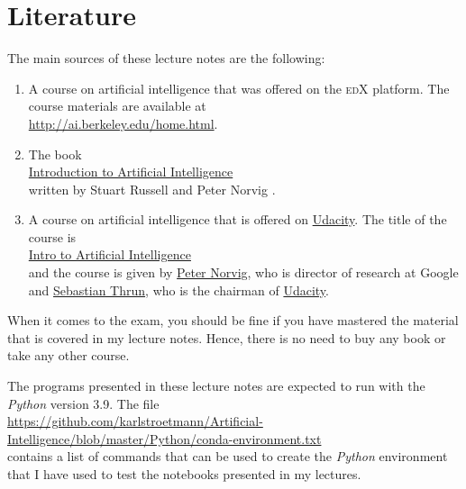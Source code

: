 \section{Literature}
The main sources of these lecture notes are the following:
\begin{enumerate}
\item A course on artificial intelligence that was offered on the \textsc{edX} platform.  The course
      materials are available at  
      \\[0.2cm]
      \hspace*{1.3cm}
      \href{http://ai.berkeley.edu/home.html}{http://ai.berkeley.edu/home.html}.
\item The book
      \\[0.2cm]
      \hspace*{1.3cm}
      \href{https://www.amazon.de/Artificial-Intelligence-Modern-Approach-Global/dp/1292401133/}{Introduction to Artificial Intelligence}
      \\[0.2cm]
      written by Stuart Russell and Peter Norvig \cite{russell:2020}.
\item A course on artificial intelligence that is offered on \href{https://www.udacity.com}{Udacity}.  The title of the
      course is
      \\[0.2cm]
      \hspace*{1.3cm}
      \href{https://www.udacity.com/course/intro-to-artificial-intelligence--cs271}{Intro to Artificial Intelligence}
      \\[0.2cm]
      and the course is given by \href{https://en.wikipedia.org/wiki/Peter_Norvig}{Peter Norvig}, who is
      director of research at Google and \href{https://en.wikipedia.org/wiki/Sebastian_Thrun}{Sebastian Thrun},
      who is the chairman of \href{https://www.udacity.com}{Udacity}.
\end{enumerate}
When it comes to the exam, you should be fine if you have mastered the material that is covered in my
lecture notes.  Hence, there is no need to buy any book or take any other course.

\remark
The programs presented in these lecture notes are expected to run with the \textsl{Python} version 3.9.
The file 
\\[0.2cm]
\hspace*{-0.3cm}
\href{https://github.com/karlstroetmann/Artificial-Intelligence/blob/master/Python/conda-environment.txt}{https://github.com/karlstroetmann/Artificial-Intelligence/blob/master/Python/conda-environment.txt}
\\[0.2cm]
contains a list of commands that can be used to create the \textsl{Python} environment that I have used to test
the notebooks presented in my lectures.  

